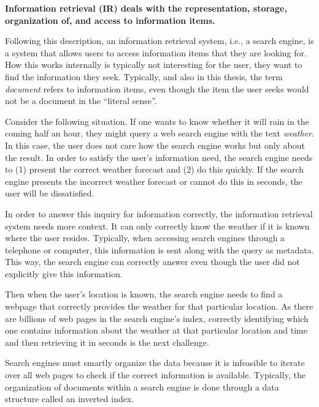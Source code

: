 \medskip
\textbf{Information retrieval (IR) deals with the representation, storage, organization of, and access to information items.}

\medskip
Following this description, an information retrieval system, i.e., a search engine, is a system that allows users to access information items that they are looking for. How this works internally is typically not interesting for the user, they want to find the information they seek. Typically, and also in this thesis, the term \emph{document} refers to information items, even though the item the user seeks would not be a document in the ``literal sense''. 

Consider the following situation. If one wants to know whether it will rain in the coming half an hour, they might query a web search engine with the text \emph{weather}. In this case, the user does not care how the search engine works but only about the result. In order to satisfy the user's information need, the search engine needs to (1) present the correct weather forecast and (2) do this quickly. If the search engine presents the incorrect weather forecast or cannot do this in seconds, the user will be dissatisfied.

In order to answer this inquiry for information correctly, the information retrieval system needs more context. It can only correctly know the weather if it is known where the user resides. Typically, when accessing search engines through a telephone or computer, this information is sent along with the query as metadata. This way, the search engine can correctly answer even though the user did not explicitly give this information. 

Then when the user's location is known, the search engine needs to find a webpage that correctly provides the weather for that particular location. As there are billions of web pages in the search engine's index, correctly identifying which one contains information about the weather at that particular location and time and then retrieving it in seconds is the next challenge.

Search engines must smartly organize the data because it is infeasible to iterate over all web pages to check if the correct information is available. Typically, the organization of documents within a search engine is done through a data structure called an inverted index.

